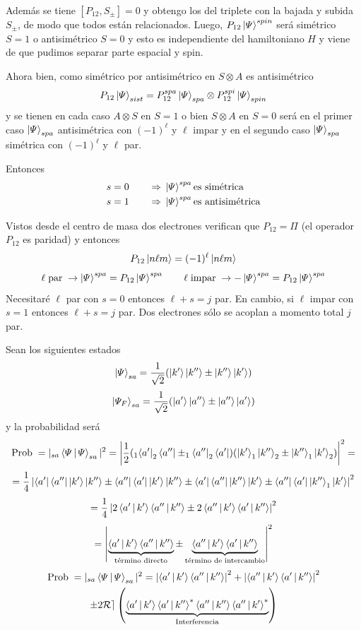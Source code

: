 \documentclass[10pt,oneside]{CBFT_book}
\begin{document}
Además se tiene $ [P_{12}, S_\pm] = 0 $ y obtengo los del triplete con la bajada y subida $S_\pm$,
de modo que todos están relacionados.
Luego, $ P_{12} \ket{\Psi}^{spin} $ será simétrico $S=1$ o antisimétrico $S=0$ y esto es 
independiente del hamiltoniano $H$ y viene de que pudimos separar parte espacial y spin.

Ahora bien, como simétrico por antisimétrico en $S\otimes A$ es antisimétrico
\[
	P_{12} \Ket{\Psi}_{sist} =
	P_{12}^{spa} \Ket{\Psi}_{spa} \otimes P_{12}^{spi} \Ket{\Psi}_{spin}
\]
y se tienen en cada caso $A \otimes S$ en $S=1$ o bien $S \otimes A$ en $S=0$ será
en el primer caso $\Ket{\Psi}_{spa}$ antisimétrica con $(-1)^\ell$ y $\ell$ impar 
y en el segundo caso $\Ket{\Psi}_{spa}$ simétrica con $(-1)^\ell$ y $\ell$ par. 


Entonces
\begin{gather*}
	\begin{aligned}
	s=0 \qquad \Rightarrow \; &\Ket{\Psi}^{spa} \text{es simétrica} \\
	s=1 \qquad \Rightarrow \; &\Ket{\Psi}^{spa} \text{es antisimétrica}
	\end{aligned}	
\end{gather*}	

Vistos desde el centro de masa dos electrones verifican que $ P_{12} = \Pi $ 
(el operador $P_{12}$ es paridad) y entonces
\[
	P_{12}\Ket{n\ell m} = (-1)^\ell \Ket{n\ell m}
\]
\[
	\ell \;\text{par} \; \rightarrow \Ket{\Psi}^{spa} = P_{12} \Ket{\Psi}^{spa} \qquad 
	\ell \;\text{impar} \; \rightarrow -\Ket{\Psi}^{spa} = P_{12} \Ket{\Psi}^{spa}
\]
Necesitaré $\ell$ par con $s=0$ entonces $\ell+s=j$ par. En cambio, si $\ell$ impar con $s=1$ entonces 
$\ell+s=j$ par. Dos electrones sólo se acoplan a momento total $j$ par.

Sean los siguientes estados 
\[
	\Ket{ \Psi }_{sa} = \frac{1}{\sqrt{2}}( \Ket{k'}\Ket{k''} \pm \Ket{k''}\Ket{k'})
\]
\[
	\Ket{ \Psi_F }_{sa} = \frac{1}{\sqrt{2}}( \Ket{a'}\Ket{a''} \pm \Ket{a''}\Ket{a'})
\]
y la probabilidad será
\[
	\text{Prob}\; = |_{sa}\Braket{\Psi|\Psi}_{sa}|^2 = 
	\left|\frac{1}{2}(_1\Bra{a'}_2\Bra{a''} \pm _1\Bra{a''}_2\Bra{a'})(\Ket{k'}_1\Ket{k''}_2 \pm 
	\Ket{k''}_1\Ket{k'}_2)\right|^2 =
\]
\[
	= \frac{1}{4}\left| \Bra{a'}\Bra{a''}\Ket{k'}\Ket{k''} \pm \Bra{a''}\Bra{a'}\Ket{k'}\Ket{k''} 
	\pm \Bra{a'}\Bra{a''}\Ket{k''}\Ket{k'} \pm \Bra{a''}\Bra{a'}\Ket{k''}_1\Ket{k'} \right|^2
\]
\[
	= \frac{1}{4}\left| 2\Braket{a'|k'}\Braket{a''|k''} \pm 2\Braket{a''|k'}\Braket{a'|k''}\right|^2
\]
\[
	= \left| \underbrace{\Braket{a'|k'}\Braket{a''|k''}}_{\text{término directo}} \pm 
	\underbrace{\Braket{a''|k'}\Braket{a'|k''}}_\text{término de intercambio}\right|^2
\]
\begin{multline*}
	\text{Prob}\; = |_{sa}\Braket{\Psi|\Psi}_{sa}|^2 = \left| \Braket{a'|k'}\Braket{a''|k''} \right|^2 + 
	\left|\Braket{a''|k'}\Braket{a'|k''}\right|^2 \\
	\pm 2\mathcal{Re}\left(\underbrace{ \Braket{a'|k'}\Braket{a'|k''}^*\Braket{a''|k''}\Braket{a''|k'}^* 
	}_\text{Interferencia}\right)
\end{multline*}
\end{document}
